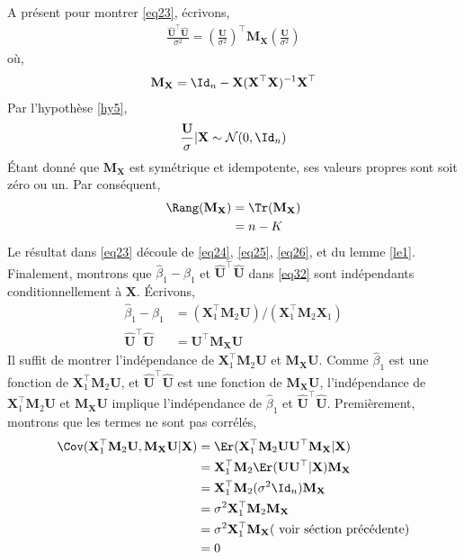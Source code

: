 A présent pour montrer \eqref{eq23}, écrivons,
\begin{align}
\frac{\widehat{\mathbf{U}}^\top\widehat{\mathbf{U}}}{\sigma^2} = \left(\frac{\mathbf{U}}{\sigma^2}\right)^\top\mathbf{M}_\mathbf{X}\left(\frac{\mathbf{U}}{\sigma^2}\right)
\label{eq24}
\end{align}
où,
\begin{align*}
\mathbf{M}_\mathbf{X}=\Id_n - \mathbf{X}(\mathbf{X}^\top\mathbf{X})^{-1}\mathbf{X}^\top
\end{align*}
Par l'hypothèse \ref{hy5},
\begin{align}
\frac{\mathbf{U}}{\sigma} | \mathbf{X}\sim\mathcal{N}(0, \Id_n)
\label{eq25}
\end{align}
\'Etant donné que $\mathbf{M}_\mathbf{X}$ est symétrique et idempotente, ses valeurs propres sont soit zéro ou un. Par conséquent,
\begin{align}
\Rang(\mathbf{M}_\mathbf{X}) &= \Tr(\mathbf{M}_\mathbf{X}) \nonumber\\
&=n-K
\label{eq26}
\end{align}
Le résultat dans \eqref{eq23} découle de \eqref{eq24},  \eqref{eq25},  \eqref{eq26}, et du lemme \ref{le1}.\\
Finalement, montrons que $\widehat{\beta}_1 - \beta_1$ et $\widehat{\mathbf{U}}^\top\widehat{\mathbf{U}}$ dans \eqref{eq32} sont indépendants conditionnellement à $\mathbf{X}$. \'Ecrivons,
\begin{align*}
\widehat{\beta}_1-\beta_1 &= (\mathbf{X}_1^\top\mathbf{M}_2\mathbf{U})/(\mathbf{X}_1^\top\mathbf{M}_2\mathbf{X}_1)\\
\widehat{\mathbf{U}}^\top\widehat{\mathbf{U}}&=\mathbf{U}^\top\mathbf{M}_\mathbf{X}\mathbf{U}
\end{align*}
Il suffit de montrer l'indépendance de $\mathbf{X}_1^\top\mathbf{M}_2\mathbf{U}$ et  $\mathbf{M}_\mathbf{X}\mathbf{U}$. Comme $\widehat{\beta}_1$ est une fonction de $\mathbf{X}_1^\top\mathbf{M}_2\mathbf{U}$, et $\widehat{\mathbf{U}}^\top\widehat{\mathbf{U}}$ est une fonction de $\mathbf{M}_\mathbf{X}\mathbf{U}$, l'indépendance de $\mathbf{X}_1^\top\mathbf{M}_2\mathbf{U}$ et  $\mathbf{M}_\mathbf{X}\mathbf{U}$ implique l'indépendance de $\widehat{\beta}_1$ et $\widehat{\mathbf{U}}^\top\widehat{\mathbf{U}}$. Premièrement, montrons que les termes ne sont pas corrélés,
\begin{align*}
\Cov(\mathbf{X}_1^\top\mathbf{M}_2\mathbf{U}, \mathbf{M}_\mathbf{X}\mathbf{U} | \mathbf{X}) &=\Er(\mathbf{X}_1^\top\mathbf{M}_2\mathbf{U}\mathbf{U}^\top \mathbf{M}_\mathbf{X}|\mathbf{X})\\
&=\mathbf{X}_1^\top\mathbf{M}_2\Er(\mathbf{U}\mathbf{U}^\top|\mathbf{X})\mathbf{M}_\mathbf{X}\\
&=\mathbf{X}_1^\top\mathbf{M}_2(\sigma^2\Id_n)\mathbf{M}_\mathbf{X}\\
&=\sigma^2\mathbf{X}_1^\top\mathbf{M}_2\mathbf{M}_\mathbf{X}\\
&=\sigma^2\mathbf{X}_1^\top\mathbf{M}_\mathbf{X}( \ \textrm{voir séction précédente})\\
&=0
\end{align*}
